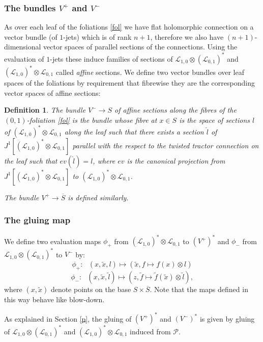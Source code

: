 \documentclass{amsart}
\newtheorem{defi}{Definition}[section]
\begin{document}
\subsubsection{The bundles  $V^+$ and $V^-$}\label{bun} As over each leaf of the foliations \ref{fol} we have flat holomorphic connection on a vector bundle (of $1$-jets) which is of rank $n+1$, therefore we also have $(n+1)$-dimensional vector spaces of parallel sections of the connections. Using the evaluation of $1$-jets these  induce families of sections of $\mathcal{L}_{1,0}\otimes(\mathcal{L}_{0,1})^*$ and $(\mathcal{L}_{1,0})^*\otimes\mathcal{L}_{0,1} $  called \emph{affine} sections. We define two vector bundles over leaf spaces of the foliations by requirement that fibrewise they are the corresponding vector spaces of affine sections:
\begin{defi}\label{d:affine} 
The bundle $V^-\to S$ of \emph{affine
sections} along the fibres of the $(0,1)$-foliation \ref{fol}
is the bundle whose fibre at $x\in S$ is the space of sections $l$ of $(\mathcal{L}_{1,0})^*\otimes\mathcal{L}_{0,1}$ along the leaf such that there exists  a section $\hat{l}$ of $J^1[(\mathcal{L}_{1,0})^*\otimes\mathcal{L}_{0,1}]$ parallel with the respect to the twisted tractor connection on the leaf such that $ev(\hat{l})=l$, where $ev$ is the canonical projection from $J^1[(\mathcal{L}_{1,0})^*\otimes\mathcal{L}_{0,1}]$ to $(\mathcal{L}_{1,0})^*\otimes\mathcal{L}_{0,1}$.

The
bundle $V^+\to \overline{S}$ is defined similarly. 
\end{defi}
\subsubsection{The gluing map} We define two evaluation maps $\phi_+$ from $(\mathcal{L}_{1,0})^*\otimes\mathcal{L}_{0,1} $  to $(V^+)^*$ and $\phi_-$ from $\mathcal{L}_{1,0}\otimes(\mathcal{L}_{0,1})^*$ to $V^-$  by:
\begin{equation}
\phi_+: \ \ \ (x,\tilde{x},l) \mapsto (\tilde{x}, f\mapsto f(x)\otimes l)
\end{equation}
\begin{equation}
\phi_-: \ \ \ (x,\tilde{x},\tilde{l}) \mapsto (z, \tilde{f}\mapsto \tilde{f}(\tilde{x})\otimes \tilde{l}),
\end{equation}
where $(x,\tilde{x})$ denote points on the base $S\times\overline{S}$.
Note that the maps defined in this way behave like blow-down.

As explained in Section \ref{p}, the gluing of $(V^+)^*$ and $(V^-)^*$ is given by gluing of $\mathcal{L}_{1,0}\otimes(\mathcal{L}_{0,1})^*$ and $(\mathcal{L}_{1,0})^*\otimes\mathcal{L}_{0,1} $ induced from $\mathcal{P}$. 
\end{document}
